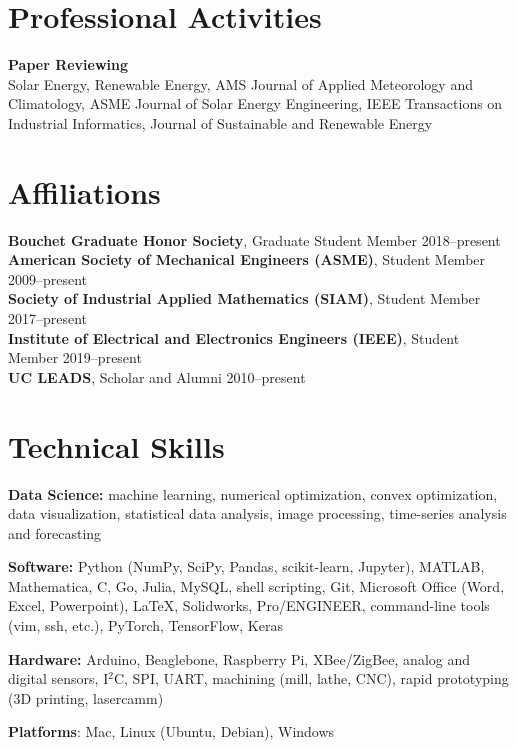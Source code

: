 \documentclass[10pt]{res}
\begin{document}
\begin{resume}
\section{Professional Activities}
\vspace{0.1in}

\textbf{Paper Reviewing} \\
Solar Energy, Renewable Energy, AMS Journal of Applied Meteorology and
Climatology, ASME Journal of Solar Energy Engineering, IEEE Transactions on
Industrial Informatics, Journal of Sustainable and Renewable Energy


\section{Affiliations}
\vspace{0.1in}

\textbf{Bouchet Graduate Honor Society}, Graduate Student Member \hfill 2018--present \\
\textbf{American Society of Mechanical Engineers (ASME)}, Student Member \hfill 2009--present \\
\textbf{Society of Industrial Applied Mathematics (SIAM)}, Student Member \hfill 2017--present \\
\textbf{Institute of Electrical and Electronics Engineers (IEEE)}, Student Member \hfill 2019--present \\
\textbf{UC LEADS}, Scholar and Alumni \hfill 2010--present


\section{Technical Skills}
\vspace{0.1in}

\textbf{Data Science:} machine learning, numerical optimization, convex
optimization, data visualization, statistical data analysis, image processing,
time-series analysis and forecasting

\textbf{Software:} Python (NumPy, SciPy, Pandas, scikit-learn, Jupyter),
MATLAB, Mathematica, C, Go, Julia, MySQL, shell scripting, Git, Microsoft Office
(Word, Excel, Powerpoint), LaTeX, Solidworks, Pro/ENGINEER, command-line tools
(vim, ssh, etc.), PyTorch, TensorFlow, Keras

\textbf{Hardware:} Arduino, Beaglebone, Raspberry Pi, XBee/ZigBee, analog and
digital sensors, I$^2$C, SPI, UART, machining (mill, lathe, CNC), rapid
prototyping (3D printing, lasercamm)

\textbf{Platforms}: Mac, Linux (Ubuntu, Debian), Windows

\end{resume}
\end{document}
